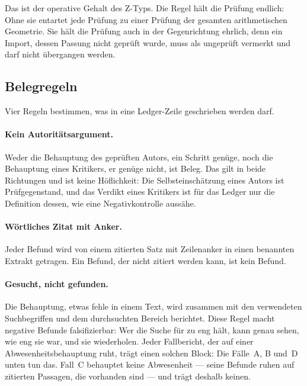 \documentclass[11pt,a4paper]{article}
\theoremstyle{definition}
\begin{document}
Das ist der operative Gehalt des Z-Typs. Die Regel hält die Prüfung endlich: Ohne
sie entartet jede Prüfung zu einer Prüfung der gesamten arithmetischen Geometrie.
Sie hält die Prüfung auch in der Gegenrichtung ehrlich, denn ein Import, dessen
Passung nicht geprüft wurde, muss als ungeprüft vermerkt und darf nicht
übergangen werden.

\subsection{Belegregeln}
\label{sec:evidence}

Vier Regeln bestimmen, was in eine Ledger-Zeile geschrieben werden darf.

\paragraph{Kein Autoritätsargument.} Weder die Behauptung des geprüften Autors,
ein Schritt genüge, noch die Behauptung eines Kritikers, er genüge nicht, ist
Beleg. Das gilt in beide Richtungen und ist keine Höflichkeit: Die
Selbsteinschätzung eines Autors ist Prüfgegenstand, und das Verdikt eines
Kritikers ist für das Ledger nur die Definition dessen, wie eine Negativkontrolle
aussähe.

\paragraph{Wörtliches Zitat mit Anker.} Jeder Befund wird von einem zitierten
Satz mit Zeilenanker in einen benannten Extrakt getragen. Ein Befund, der nicht
zitiert werden kann, ist kein Befund.

\paragraph{\glqq Gesucht, nicht gefunden\grqq.} Die Behauptung, etwas fehle in einem Text,
wird zusammen mit den verwendeten Suchbegriffen und dem durchsuchten Bereich
berichtet. Diese Regel macht negative Befunde falsifizierbar: Wer die Suche für
zu eng hält, kann genau sehen, wie eng sie war, und sie wiederholen. Jeder
Fallbericht, der auf einer Abwesenheitsbehauptung ruht, trägt einen solchen Block:
Die Fälle~A, B und~D unten tun das. Fall~C behauptet keine Abwesenheit --- seine
Befunde ruhen auf zitierten Passagen, die vorhanden sind --- und trägt deshalb
keinen.
\end{document}
